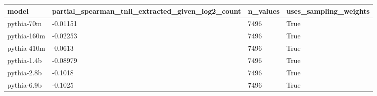 \begin{tabular}{llll}
\toprule
model & partial\_spearman\_tnll\_extracted\_given\_log2\_count & n\_values & uses\_sampling\_weights \\
\midrule
pythia-70m & -0.01151 & 7496 & True \\
pythia-160m & -0.02253 & 7496 & True \\
pythia-410m & -0.0613 & 7496 & True \\
pythia-1.4b & -0.08979 & 7496 & True \\
pythia-2.8b & -0.1018 & 7496 & True \\
pythia-6.9b & -0.1025 & 7496 & True \\
\bottomrule
\end{tabular}
